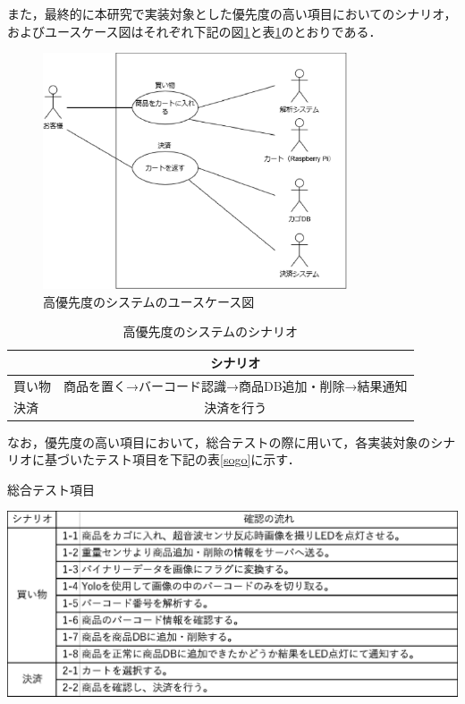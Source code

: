 また，最終的に本研究で実装対象とした優先度の高い項目においてのシナリオ，およびユースケース図はそれぞれ下記の図\ref{use}と表\ref{sina}のとおりである．


\begin{figure}[htbp]
\centering
\includegraphics[width = 9cm]{./picture/usecase_saishu.eps}
\caption{高優先度のシステムのユースケース図}
\label{use}
\end{figure}

\begin{table}[htbp]
\begin{center}
\caption{高優先度のシステムのシナリオ}
\begin{tabular}{|l|c|} \hline
 & シナリオ \\ \hline \hline
買い物 & 商品を置く→バーコード認識→商品DB追加・削除→結果通知 \\
決済 & 決済を行う \\ \hline
\end{tabular}
\label{sina}
\end{center}
\end{table}

なお，優先度の高い項目において，総合テストの際に用いて，各実装対象のシナリオに基づいたテスト項目を下記の表\ref{sogo}に示す．

\begin{table}[htbp]
\centering
\caption{総合テスト項目}
\includegraphics[width = 15cm]{./picture/sogo.eps}
\label{sogo}
\end{table}

\newpage